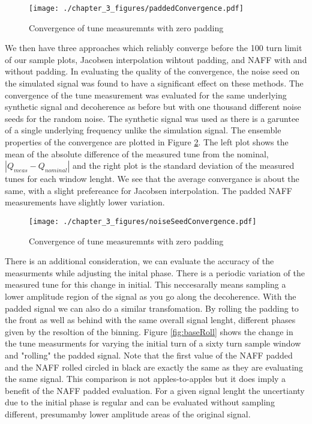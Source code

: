 \begin{figure}
	\centering
	\texttt{[image: ./chapter\_3\_figures/paddedConvergence.pdf]}
	\caption{Convergence of tune measuremnts with zero padding}
	\label{fig:padConv}
\end{figure}

We then have three approaches which reliably converge before the 100 turn limit of our sample plots, Jacobsen interpolation wihtout padding, and NAFF with and without padding. In evaluating the quality of the convergence, the noise seed on the simulated signal was found to have a significant effect on these methods. The convergence of the tune measurement was evaluated for the same underlying synthetic signal and decoherence as before but with one thousand different noise seeds for the random noise. The synthetic signal was used as there is a garuntee of a single underlying frequency unlike the simulation signal. The ensemble properties of the convergence are plotted in Figure \ref{fig:noiseConv}. The left plot shows the mean of the absolute difference of the measured tune from the nominal, $|Q_{meas} - Q_{nominal}|$ and the right plot is the standard deviation of the measured tunes for each window lenght. We see that the average convergance is about the same, with a slight prefereance for Jacobsen interpolation. The padded NAFF measurements have slightly lower variation.


\begin{figure}
	\centering
	\texttt{[image: ./chapter\_3\_figures/noiseSeedConvergence.pdf]}
	\caption{Convergence of tune measuremnts with zero padding}
	\label{fig:noiseConv}
\end{figure}

There is an additional consideration, we can evaluate the accuracy of the measurments while adjusting the inital phase. There is a periodic variation of the measured tune for this change in initial.  This neccesarally means sampling a lower amplitude region of the signal as you go along the decoherence. With the padded signal we can also do a similar transfomation. By rolling the padding to the front as well as behind with the same overall signal lenght, different phases given by the resoltion of the binning. Figure \ref{fig:baseRoll} shows the change in the tune measurments for varying the initial turn of a sixty turn sample window and "rolling" the padded signal. Note that the first value of the NAFF padded and the NAFF rolled circled in black are exactly the same as they are evaluating the same signal. This comparison is not apples-to-apples but it does imply a benefit of the NAFF padded evaluation. For a given signal lenght the uncertianty due to the initial phase is regular and can be evaluated without sampling different, presumamby lower amplitude areas of the original signal.

